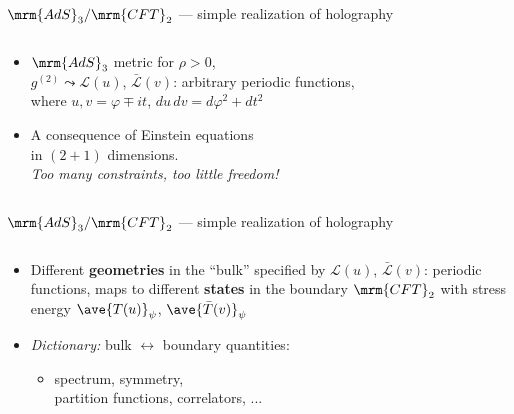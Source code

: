 \documentclass[
	10pt
	,handout
	,noamsthm
]{beamer}
\begin{document}
\begin{frame}{$\mrm{AdS}_3/\mrm{CFT}_2$ --- simple realization of holography}{%
	\textcite{Banados:1992wn}
}
\begin{columns}
\figAdsCft
\begin{column}{.72\textwidth}
	\begin{itemize}
	\item $\mrm{AdS}_3$ metric for $\rho > 0$, \\
	\textcite{Banados:1998gg}
	\eqBanados
	$g^{(2)} \leadsto \mathcal L(u)$, $\bar{\mathcal L}(v)$: arbitrary periodic functions,\\
	where $u,v = \varphi \mp it$, $du\,dv = d\varphi^2 + dt^2$
	
\pause
	\item A consequence of Einstein equations \\
	in $(2+1)$ dimensions.\\
	\textit{Too many constraints, too little freedom!}
	\end{itemize}
\end{column}
\end{columns}
\end{frame}


\begin{frame}{$\mrm{AdS}_3/\mrm{CFT}_2$ --- simple realization of holography}{%
	\textcite{Aharony:1999ti}
}
\begin{columns}
\figAdsCft
\begin{column}{.72\textwidth}
	\begin{itemize}
	\item Different \textbf{geometries} in the ``bulk''
	\eqBanados
	specified by $\mathcal L(u)$, $\bar{\mathcal L}(v)$: periodic functions, maps to different \textbf{states} in the boundary $\mrm{CFT}_2$ with stress energy $\ave{T(u)}_\psi$, $\ave{\bar{T}(v)}_\psi$

	\item \textit{Dictionary:} bulk $\leftrightarrow$ boundary quantities:\\
		\begin{itemize}
		\item spectrum,
			symmetry,\\
			partition functions,
			correlators, ...
		\end{itemize}
	\end{itemize}

\end{column}
\end{columns}
\end{frame}
\end{document}
